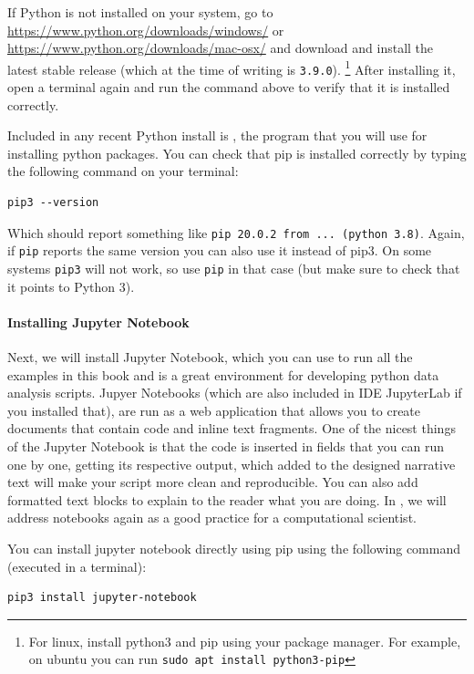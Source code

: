If Python is not installed on your system, go to \url{https://www.python.org/downloads/windows/} or \url{https://www.python.org/downloads/mac-osx/} and download and install the latest stable release (which at the time of writing is \verb|3.9.0|).
\footnote{For linux, install python3 and pip using your package manager. For example, on ubuntu you can run \texttt{sudo apt install python3-pip}}
After installing it, open a terminal again and run the command above to verify that it is installed correctly.

Included in any recent Python install is , the program that you will use for installing python packages.
You can check that pip is installed correctly by typing the following command on your terminal:

\begin{verbatim}
pip3 --version
\end{verbatim}

Which should report something like \texttt{pip 20.0.2 from ... (python 3.8)}.
Again, if \verb|pip| reports the same version you can also use it instead of pip3.
On some systems \verb|pip3| will not work, so use \verb|pip| in that case
(but make sure to check that it points to Python 3).

\paragraph{Installing Jupyter Notebook}
Next, we will install Jupyter Notebook, which you can use to run all the examples in this book
and is a great environment for developing python data analysis scripts.
Jupyer Notebooks (which are also included in IDE JupyterLab if you installed that), 
are run as a web application
that allows you to create documents that contain code and inline text fragments.
 One of the nicest things of
the Jupyter Notebook is that the code is inserted in fields that you
can run one by one, getting its respective output, which added to the
designed narrative text will make your script more clean and
reproducible. You can also add formatted text blocks to explain to the
reader what you are doing. In , we will address
notebooks again as a good practice for a computational scientist.

You can install jupyter notebook directly using pip using the following command
(executed in a terminal):

\begin{verbatim}
pip3 install jupyter-notebook
\end{verbatim}

